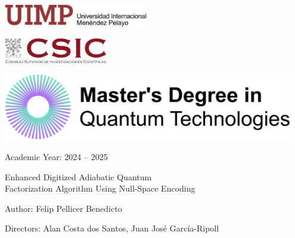 \begin{titlepage}

\begin{center}

\noindent
\begin{minipage}[t]{0.45\textwidth}
    \raggedright
    \includegraphics[height=1cm]{00-frontmatter/logos/uimp_logo.pdf}
\end{minipage}%
\hfill
\begin{minipage}[t]{0.45\textwidth}
    \raggedleft
    \includegraphics[height=1.1cm]{00-frontmatter/logos/csic_logo.pdf}
\end{minipage}

\vspace{4cm}

\includegraphics[width=0.95\textwidth]{00-frontmatter/logos/master_logo.pdf}

\vspace{1cm}
{\Large Academic Year: 2024 -- 2025 \par}

\vspace{1cm}
{\huge
Enhanced Digitized Adiabatic Quantum\\[0.2cm]
Factorization Algorithm Using Null-Space Encoding\par}

\vspace{5cm}

{\Large Author: Felip Pellicer Benedicto \par}
\vspace{0.3cm}
{\Large Directors: Alan Costa dos Santos, Juan José García-Ripoll \par}

\end{center}

\restoregeometry
\end{titlepage}
